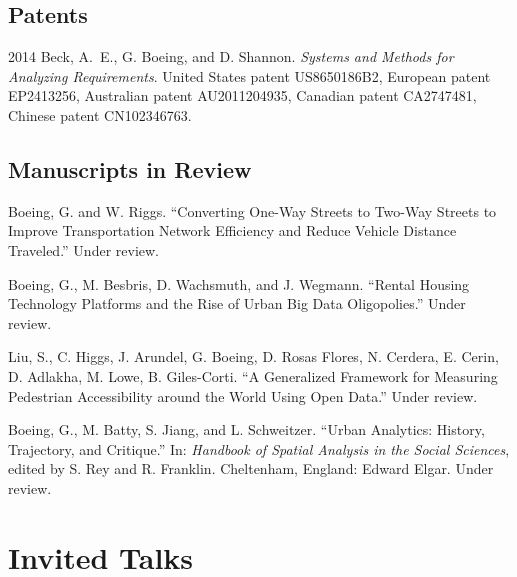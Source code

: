 \documentclass[12pt,letterpaper]{report}
\begin{document}
    \subsection*{Patents}

    \begin{tablist}

        \item[2014] \tab Beck, A.~E., G. Boeing, and D. Shannon. \textit{Systems and Methods for Analyzing Requirements}. United States patent US8650186B2, European patent EP2413256, Australian patent AU2011204935, Canadian patent CA2747481, Chinese patent CN102346763.

    \end{tablist}



    \subsection*{Manuscripts in Review}

    \begin{tablist}

        \item[\the\year] \tab Boeing, G. and W. Riggs. \enquote{Converting One-Way Streets to Two-Way Streets to Improve Transportation Network Efficiency and Reduce Vehicle Distance Traveled.} Under review.

        \item[\the\year] \tab Boeing, G., M. Besbris, D. Wachsmuth, and J. Wegmann. \enquote{Rental Housing Technology Platforms and the Rise of Urban Big Data Oligopolies.} Under review.

        \item[\the\year] \tab Liu, S., C. Higgs, J. Arundel, G. Boeing, D. Rosas Flores, N. Cerdera, E. Cerin, D. Adlakha, M. Lowe, B. Giles-Corti. \enquote{A Generalized Framework for Measuring Pedestrian Accessibility around the World Using Open Data.} Under review.

        \item[\the\year] \tab Boeing, G., M. Batty, S. Jiang, and L. Schweitzer. \enquote{Urban Analytics: History, Trajectory, and Critique.} In: \textit{Handbook of Spatial Analysis in the Social Sciences}, edited by S. Rey and R. Franklin. Cheltenham, England: Edward Elgar. Under review.

    \end{tablist}



    \section*{Invited Talks}
\end{document}
